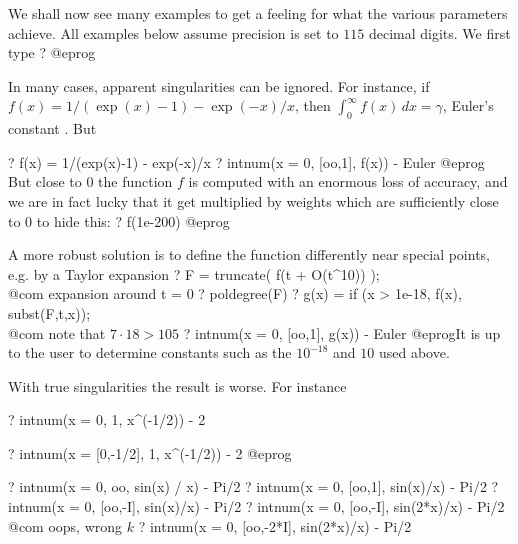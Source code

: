 \smallskip

We shall now see many examples to get a feeling for what the various
parameters achieve. All examples below assume precision is set to $115$
decimal digits. We first type
\bprog
? 
@eprog

 In many cases, apparent singularities
can be ignored. For instance, if $f(x) = 1
/(\exp(x)-1) - \exp(-x)/x$, then $\int_0^\infty f(x)\,dx=\gamma$, Euler's
constant . But

\bprog
? f(x) = 1/(exp(x)-1) - exp(-x)/x
? intnum(x = 0, [oo,1],  f(x)) - Euler
@eprog\noindent
But close to $0$ the function $f$ is computed with an enormous loss of
accuracy, and we are in fact lucky that it get multiplied by weights which are
sufficiently close to $0$ to hide this:
\bprog
? f(1e-200)
@eprog

A more robust solution is to define the function differently near special
points, e.g. by a Taylor expansion
\bprog
? F = truncate( f(t + O(t^10)) ); \\@com expansion around t = 0
? poldegree(F)
? g(x) = if (x > 1e-18, f(x), subst(F,t,x)); \\@com note that $7 \cdot 18 > 105$
? intnum(x = 0, [oo,1],  g(x)) - Euler
@eprog\noindent It is up to the user to determine constants such as the
$10^{-18}$ and $10$ used above.

 With true singularities the result is worse.
For instance

\bprog
? intnum(x = 0, 1,  x^(-1/2)) - 2

? intnum(x = [0,-1/2], 1,  x^(-1/2)) - 2
@eprog


\bprog
? intnum(x = 0, oo, sin(x) / x) - Pi/2
? intnum(x = 0, [oo,1], sin(x)/x) - Pi/2
? intnum(x = 0, [oo,-I], sin(x)/x) - Pi/2
? intnum(x = 0, [oo,-I], sin(2*x)/x) - Pi/2  \\@com oops, wrong $k$
? intnum(x = 0, [oo,-2*I], sin(2*x)/x) - Pi/2

